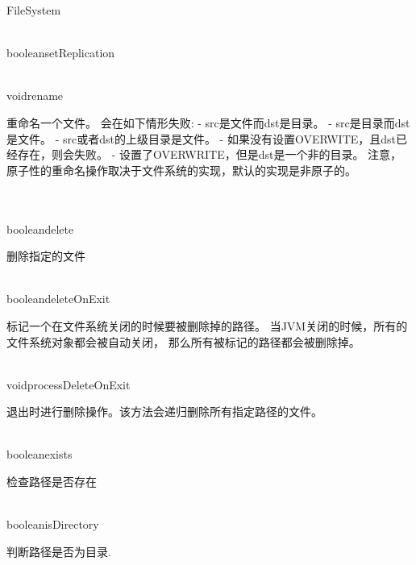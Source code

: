 \begin{XeClass}{FileSystem}
\begin{XeMethod}{\XePublic\\ }{boolean}{setReplication}
  \end{XeMethod}

  \begin{XeMethod}{\XeProtected\\ }{void}{rename}
       
 重命名一个文件。
 会在如下情形失败:
 - src是文件而dst是目录。
 - src是目录而dst是文件。
 - src或者dst的上级目录是文件。
 - 如果没有设置OVERWITE，且dst已经存在，则会失败。
 - 设置了OVERWRITE，但是dst是一个非的目录。
 注意，原子性的重命名操作取决于文件系统的实现，默认的实现是非原子的。

  \end{XeMethod}

  \begin{XeMethod}{\XePublic\\ \XeAbstract\\ }{boolean}{delete}
       
 删除指定的文件

  \end{XeMethod}

  \begin{XeMethod}{\XePublic\\ }{boolean}{deleteOnExit}
       
 标记一个在文件系统关闭的时候要被删除掉的路径。
 当JVM关闭的时候，所有的文件系统对象都会被自动关闭，
 那么所有被标记的路径都会被删除掉。

  \end{XeMethod}

  \begin{XeMethod}{\XeProtected\\ }{void}{processDeleteOnExit}
       
 退出时进行删除操作。该方法会递归删除所有指定路径的文件。

  \end{XeMethod}

  \begin{XeMethod}{\XePublic\\ }{boolean}{exists}
       
 检查路径是否存在

  \end{XeMethod}

  \begin{XeMethod}{\XePublic\\ }{boolean}{isDirectory}
       
 判断路径是否为目录.

  \end{XeMethod}


\end{XeClass}

